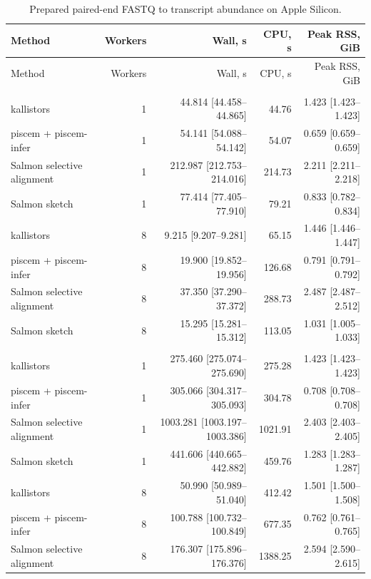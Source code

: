 \begingroup
\small
\setlength{\tabcolsep}{4pt}
\begin{longtable}{@{}lrrrr@{}}
\caption{Prepared paired-end FASTQ to transcript abundance on Apple Silicon.}\label{tab:paper-bulk-paired}\\
\toprule
Method & Workers & Wall, s & CPU, s & Peak RSS, GiB \\
\midrule
\endfirsthead
\toprule
Method & Workers & Wall, s & CPU, s & Peak RSS, GiB \\
\midrule
\endhead
\bottomrule
\endfoot
\addlinespace
\multicolumn{5}{@{}l}{\textit{SRR13638690}} \\
kallistors & 1 & 44.814 [44.458--44.865] & 44.76 & 1.423 [1.423--1.423] \\
piscem + piscem-infer & 1 & 54.141 [54.088--54.142] & 54.07 & 0.659 [0.659--0.659] \\
Salmon selective alignment & 1 & 212.987 [212.753--214.016] & 214.73 & 2.211 [2.211--2.218] \\
Salmon sketch & 1 & 77.414 [77.405--77.910] & 79.21 & 0.833 [0.782--0.834] \\
kallistors & 8 & 9.215 [9.207--9.281] & 65.15 & 1.446 [1.446--1.447] \\
piscem + piscem-infer & 8 & 19.900 [19.852--19.956] & 126.68 & 0.791 [0.791--0.792] \\
Salmon selective alignment & 8 & 37.350 [37.290--37.372] & 288.73 & 2.487 [2.487--2.512] \\
Salmon sketch & 8 & 15.295 [15.281--15.312] & 113.05 & 1.031 [1.005--1.033] \\
\addlinespace
\multicolumn{5}{@{}l}{\textit{SRR307903}} \\
kallistors & 1 & 275.460 [275.074--275.690] & 275.28 & 1.423 [1.423--1.423] \\
piscem + piscem-infer & 1 & 305.066 [304.317--305.093] & 304.78 & 0.708 [0.708--0.708] \\
Salmon selective alignment & 1 & 1003.281 [1003.197--1003.386] & 1021.91 & 2.403 [2.403--2.405] \\
Salmon sketch & 1 & 441.606 [440.665--442.882] & 459.76 & 1.283 [1.283--1.287] \\
kallistors & 8 & 50.990 [50.989--51.040] & 412.42 & 1.501 [1.500--1.508] \\
piscem + piscem-infer & 8 & 100.788 [100.732--100.849] & 677.35 & 0.762 [0.761--0.765] \\
Salmon selective alignment & 8 & 176.307 [175.896--176.376] & 1388.25 & 2.594 [2.590--2.615] \\

\end{longtable}
